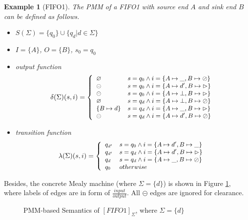 \documentclass[conference, a4paper]{IEEEtran}
\newtheorem{example}{Example}
\newcommand{\rblock}[0]{\circleddash}
\newcommand{\rread}[0]{\rhd}
\newcommand{\rnoread}[0]{\oslash}
\newcommand{\smap}[1]{[{#1}]}
\newcommand{\rempty}[0]{\varnothing}
\begin{document}
\begin{example}[FIFO1]
  \label{example:pmmfifo}
  The PMM of a FIFO1 with source end $A$ and sink end $B$ can be defined as follows.
  \begin{itemize}
    \item[-] $S(\Sigma)=\{q_0\}\cup\{q_d|d\in\Sigma\}$
    \item[-] $I=\{A\}$, $O=\{B\}$, $s_0=q_0$
    \item[-] output function
      \begin{displaymath}
        \small
        \delta(\Sigma)(s,i)=\left\{
        \begin{array}[ht]{ll}
          \rempty & s=q_0\land i=\{A\mapsto\_,B\mapsto\rnoread\} \\
          \rblock & s=q_0\land i=\{A\mapsto d',B\mapsto\rread\} \\
          \rblock & s=q_0\land i=\{A\mapsto\bot,B\mapsto\rread\} \\
          \rempty & s=q_d\land i=\{A\mapsto\bot,B\mapsto\rnoread\} \\     
          \{B\mapsto d\} & s=q_d\land i=\{A\mapsto\_,B\mapsto\rread\}\\
          \rblock & s=q_d\land i=\{A\mapsto d',B\mapsto \rnoread\} \\
        \end{array}
        \right.
      \end{displaymath}
    \item[-] transition function
      \begin{displaymath}
        \small
        \lambda(\Sigma)(s,i)=\left\{
        \begin{array}[ht]{ll}
          q_{d'} & s=q_0\land i=\{A\mapsto d',B\mapsto\_\} \\
          q_{d'} & s=q_{d}\land i=\{A\mapsto d',B\mapsto \rread\} \\
          q_{d} & s=q_{d}\land i=\{A\mapsto \_,B\mapsto \rnoread\} \\
          q_0 & otherwise \\
        \end{array}
        \right.
      \end{displaymath}
  \end{itemize}
\end{example}

Besides, the concrete Mealy machine (where $\Sigma=\{d\}$) is shown in Figure \ref{fig:pmmfifo},
where labels of edges are in form of $\frac{input}{output}$. All $\rblock$ edges are ignored for
clearance.
\begin{figure}[ht]
  \begin{center}
    
  \end{center}
  \caption{PMM-based Semantics of $\smap{FIFO1}_\Sigma$, where $\Sigma=\{d\}$}
  \label{fig:pmmfifo}
\end{figure}
\end{document}
